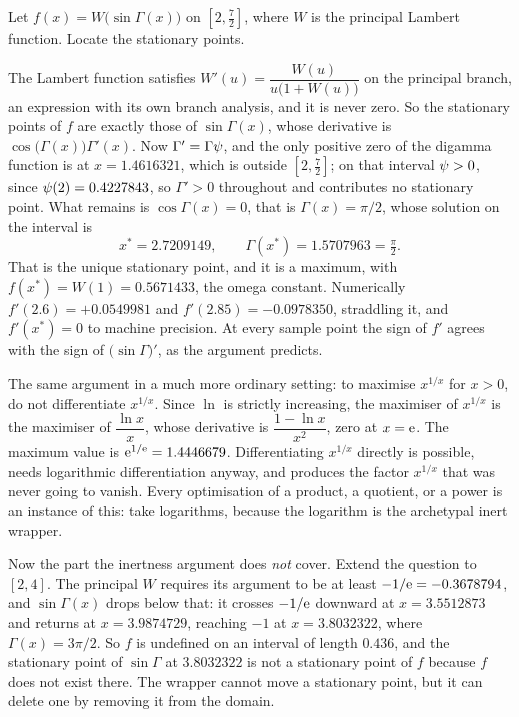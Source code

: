 \begin{worked}
Let $f(x)=W\bigl(\sin\Gamma(x)\bigr)$ on $[2,\tfrac72]$, where $W$ is the principal Lambert function. Locate the stationary points.

The Lambert function satisfies $W'(u)=\dfrac{W(u)}{u\bigl(1+W(u)\bigr)}$ on the principal branch, an expression with its own branch analysis, and it is never zero. So the stationary points of $f$ are exactly those of $\sin\Gamma(x)$, whose derivative is $\cos\bigl(\Gamma(x)\bigr)\Gamma'(x)$. Now $\Gamma'=\Gamma\psi$, and the only positive zero of the digamma function is at $x=1.4616321$, which is outside $[2,\tfrac72]$; on that interval $\psi>0$, since $\psi(2)=0.4227843$, so $\Gamma'>0$ throughout and contributes no stationary point. What remains is $\cos\Gamma(x)=0$, that is $\Gamma(x)=\pi/2$, whose solution on the interval is
\[
x^{*}=2.7209149,\qquad \Gamma(x^{*})=1.5707963=\tfrac{\pi}{2}.
\]
That is the unique stationary point, and it is a maximum, with $f(x^{*})=W(1)=0.5671433$, the omega constant. Numerically $f'(2.6)=+0.0549981$ and $f'(2.85)=-0.0978350$, straddling it, and $f'(x^{*})=0$ to machine precision. At every sample point the sign of $f'$ agrees with the sign of $\bigl(\sin\Gamma\bigr)'$, as the argument predicts.

The same argument in a much more ordinary setting: to maximise $x^{1/x}$ for $x>0$, do not differentiate $x^{1/x}$. Since $\ln$ is strictly increasing, the maximiser of $x^{1/x}$ is the maximiser of $\dfrac{\ln x}{x}$, whose derivative is $\dfrac{1-\ln x}{x^{2}}$, zero at $x=\mathrm{e}$. The maximum value is $\mathrm{e}^{1/\mathrm{e}}=1.4446679$. Differentiating $x^{1/x}$ directly is possible, needs logarithmic differentiation anyway, and produces the factor $x^{1/x}$ that was never going to vanish. Every optimisation of a product, a quotient, or a power is an instance of this: take logarithms, because the logarithm is the archetypal inert wrapper.

Now the part the inertness argument does \emph{not} cover. Extend the question to $[2,4]$. The principal $W$ requires its argument to be at least $-1/\mathrm{e}=-0.3678794$, and $\sin\Gamma(x)$ drops below that: it crosses $-1/\mathrm{e}$ downward at $x=3.5512873$ and returns at $x=3.9874729$, reaching $-1$ at $x=3.8032322$, where $\Gamma(x)=3\pi/2$. So $f$ is undefined on an interval of length $0.436$, and the stationary point of $\sin\Gamma$ at $3.8032322$ is not a stationary point of $f$ because $f$ does not exist there. The wrapper cannot move a stationary point, but it can delete one by removing it from the domain.
\end{worked}

